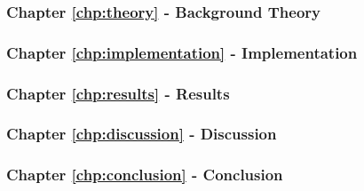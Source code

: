 \subsubsection{Chapter \ref{chp:theory} - Background Theory}

\subsubsection{Chapter \ref{chp:implementation} - Implementation}

\subsubsection{Chapter \ref{chp:results} - Results}

\subsubsection{Chapter \ref{chp:discussion} - Discussion}

\subsubsection{Chapter \ref{chp:conclusion} - Conclusion}